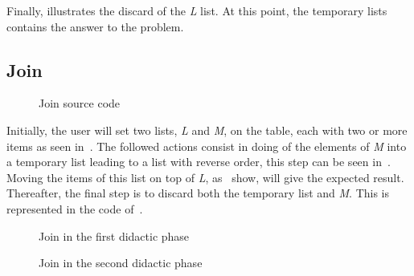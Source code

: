 Finally,  illustrates the discard of the \emph{L}
list. At this point, the temporary lists contains the answer to the
problem.

\FloatBarrier
\subsection{Join}

\renewcommand*\FancyVerbStartString{BEGIN-JOIN}
\renewcommand*\FancyVerbStopString{END-JOIN}
\begin{figure}[h!]
  \caption{Join source code}
  \label{fig:code:join}
\end{figure}

Initially, the user will set two lists, \emph{L} and \emph{M}, on the
table, each with two or more items as seen in~.
The followed actions consist in doing \poppush of the elements of
\emph{M} into a temporary list leading to a list with reverse order,
this step can be seen in~. Moving
the items of this list on top of \emph{L},
as~ show, will give the expected
result. Thereafter, the final step is to discard both the temporary
list and \emph{M}. This is represented in the code
of~.

\begin{figure}[h!]
  \centering
  \caption{Join in the first didactic phase}
\end{figure}

\begin{figure}[h!]
  \centering
  \caption{Join in the second didactic phase}
  \label{fig:join:p2}
\end{figure}

